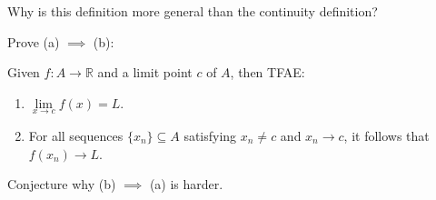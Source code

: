 \documentclass{ximera}
\begin{document}
\begin{exercise}
    Why is this definition more general than the continuity definition?
\end{exercise}

\begin{exercise}
    Prove (a) $\implies$ (b):
    \begin{theorem}
        Given $f:A \to \mathbb{R}$ and a limit point $c$ of $A$, then TFAE:
        \begin{enumerate}
            \item $\lim\limits_{x\to c} f(x) = L$.
            \item For all sequences $\{x_n\} \subseteq A$ satisfying $x_n \neq c$ and $x_n \to c$, it follows that $f(x_n) \to L$.
        \end{enumerate}
    \end{theorem}
    Conjecture why (b) $\implies$ (a) is harder.
\end{exercise}
\end{document}
